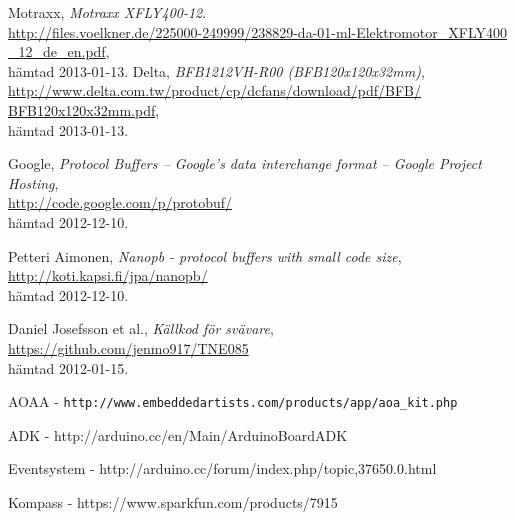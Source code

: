 \begin{thebibliography}{9}
Motraxx,
\emph{Motraxx XFLY400-12}. \\
\url{http://files.voelkner.de/225000-249999/238829-da-01-ml-Elektromotor_XFLY400
_12_de_en.pdf},
\\ hämtad 2013-01-13.
Delta,
\emph{BFB1212VH-R00 (BFB120x120x32mm)},\\
\url{http://www.delta.com.tw/product/cp/dcfans/download/pdf/BFB/
BFB120x120x32mm.pdf},
\\ hämtad 2013-01-13.

Google,
\emph{Protocol Buffers – Google's data interchange format – Google Project
Hosting}, \\
\url{http://code.google.com/p/protobuf/} \\
hämtad 2012-12-10.

Petteri Aimonen,
\emph{Nanopb - protocol buffers with small code size}, \\
\url{http://koti.kapsi.fi/jpa/nanopb/} \\
hämtad 2012-12-10.

Daniel Josefsson et al.,
\emph{Källkod för svävare}, \\
\url{https://github.com/jenmo917/TNE085} \\
hämtad 2012-01-15.
\end{thebibliography}

AOAA - \verb|http://www.embeddedartists.com/products/app/aoa_kit.php|

ADK - http://arduino.cc/en/Main/ArduinoBoardADK

Eventsystem - http://arduino.cc/forum/index.php/topic,37650.0.html

Kompass - https://www.sparkfun.com/products/7915 